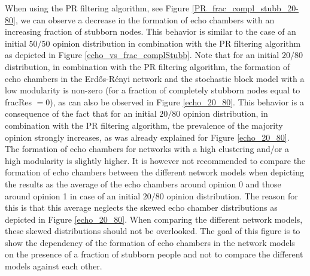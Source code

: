 \documentclass[11 pt , letterpaper , twoside , openright]{book}
\begin{document}
When using the PR filtering algorithm, see Figure \ref{PR_frac_compl_stubb_20-80}, we can observe a decrease in the formation of echo chambers with an increasing fraction of stubborn nodes. This behavior is similar to the case of an initial $50/50$ opinion distribution in combination with the PR filtering algorithm as depicted in Figure \ref{echo_vs_frac_complStubb}. Note that for an initial $20/80$ distribution, in combination with the PR filtering algorithm, the formation of echo chambers in the Erd\H{o}s-R\'{e}nyi network and the stochastic block model with a low modularity is non-zero (for a fraction of completely stubborn nodes equal to fracRes $=0$), as can also be observed in Figure \ref{echo_20_80}. This behavior is a consequence of the fact that for an initial $20/80$ opinion distribution, in combination with the PR filtering algorithm, the prevalence of the majority opinion strongly increases, as was already explained for Figure \ref{echo_20_80}. The formation of echo chambers for networks with a high clustering and/or a high modularity is slightly higher. It is however not recommended to compare the formation of echo chambers between the different network models when depicting the results as the average of the echo chambers around opinion 0 and those around opinion 1 in case of an initial $20/80$ opinion distribution. The reason for this is that this average neglects the skewed echo chamber distributions as depicted in Figure \ref{echo_20_80}. When comparing the different network models, these skewed distributions should not be overlooked. The goal of this figure is to show the dependency of the formation of echo chambers in the network models on the presence of a fraction of stubborn people and not to compare the different models against each other. \\
\newline
\end{document}
